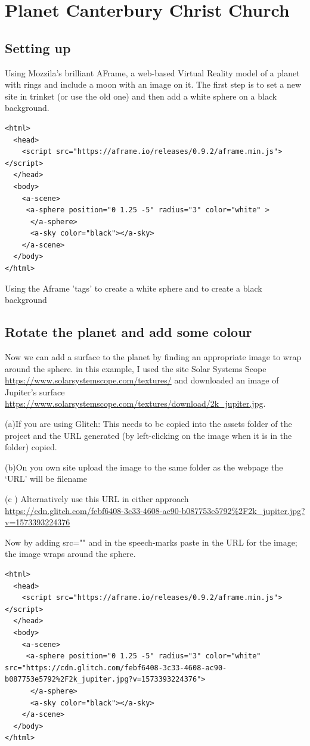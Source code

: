 \chapter{Planet Canterbury Christ Church}
\section{Setting up}
Using Mozzila's brilliant AFrame, a web-based Virtual Reality model of a planet with rings and include a moon with an image on it.
The first step is to set a new site in trinket (or use the old one)  and then add a white sphere on a black background.
\begin{lstlisting}
<html>
  <head>
    <script src="https://aframe.io/releases/0.9.2/aframe.min.js"></script>
  </head>
  <body>
    <a-scene>
     <a-sphere position="0 1.25 -5" radius="3" color="white" >
      </a-sphere>   
      <a-sky color="black"></a-sky>
    </a-scene>
  </body>
</html>
\end{lstlisting}

Using the Aframe 'tags' to create a white sphere and to create a black background

\section{Rotate the planet and add some colour}
Now we can add a surface to the planet by finding an appropriate image to wrap around the sphere. in this example, I used the site Solar Systems Scope \url{https://www.solarsystemscope.com/textures/} and downloaded an image of Jupiter's surface \url{https://www.solarsystemscope.com/textures/download/2k_jupiter.jpg}.

 

(a)If you are using Glitch: This needs to be copied into the assets folder of the project and the URL generated (by left-clicking on the image when it is in the folder) copied.

(b)On you own site upload the image to the same folder as the webpage the ‘URL’ will be filename

(c ) Alternatively use this URL in either approach \url{https://cdn.glitch.com/febf6408-3c33-4608-ac90-b087753e5792%2F2k_jupiter.jpg?v=1573393224376}

Now by adding src="" and in the speech-marks paste in the URL for the image; the image wraps around the sphere.
\begin{lstlisting}
<html>
  <head>
    <script src="https://aframe.io/releases/0.9.2/aframe.min.js"></script>
  </head>
  <body>
    <a-scene>
     <a-sphere position="0 1.25 -5" radius="3" color="white" src="https://cdn.glitch.com/febf6408-3c33-4608-ac90-b087753e5792%2F2k_jupiter.jpg?v=1573393224376">
      </a-sphere>   
      <a-sky color="black"></a-sky>
    </a-scene>
  </body>
</html>
\end{lstlisting}

